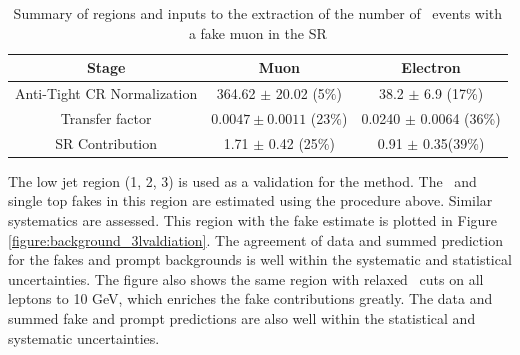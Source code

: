 \begin{table}[!htbp]
\begin{center} 
\begin{tabular}{|c|c|c|} 
  \hline
  Stage   & Muon & Electron \\
  \hline
  Anti-Tight CR Normalization  &  364.62 $\pm$ 20.02 (5$\%$) & 38.2 $\pm$ 6.9 (17\%) \\ 
  \hline  
  Transfer factor  & $0.0047 \pm 0.0011$ (23$\%$) & 0.0240 $\pm$ 0.0064 (36\%) \\
  SR Contribution & 1.71 $\pm$ 0.42 (25\%)           & 0.91 $\pm$ 0.35(39\%) \\ 
  \hline  
\end{tabular}
\caption{Summary of regions and inputs to the extraction of the number of \ttbar\ events with a fake muon in the SR}
\label{table:background_3l_summary}
\end{center}
\end{table}


The low jet region (1, 2, 3) is used as a validation for the method. The \ttbar\ and single top fakes in this region are estimated using the procedure above. Similar systematics are assessed. This region with the fake estimate is plotted in Figure \ref{figure:background_3lvaldiation}. The agreement of data and summed prediction for the fakes and prompt backgrounds is well within the systematic and statistical uncertainties. The figure also shows the same region with relaxed \pt\ cuts on all leptons to 10 GeV, which enriches the fake contributions greatly.   The data and summed fake and prompt predictions are also well within the statistical and systematic uncertainties.


